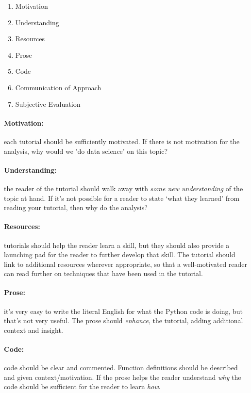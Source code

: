 \documentclass{article}
\begin{document}
\begin{enumerate}
  \item Motivation
  \item Understanding
  \item Resources
  \item Prose
  \item Code
  \item Communication of Approach
  \item Subjective Evaluation
\end{enumerate}

\paragraph{Motivation:} each tutorial should be sufficiently motivated. If
  there is not motivation for the analysis, why would we 'do data science'
  on this topic?

\paragraph{Understanding:} the reader of the tutorial should walk away with
  \emph{some new understanding} of the topic at hand. If it's not possible
  for a reader to state `what they learned' from reading your tutorial, then
  why do the analysis?

\paragraph{Resources:} tutorials should help the reader learn a skill, but
  they should also provide a launching pad for the reader to further develop
  that skill. The tutorial should link to additional resources wherever
  appropriate, so that a well-motivated reader can read further on techniques
  that have been used in the tutorial.

\paragraph{Prose:} it's very easy to write the literal English for what the
  Python code is doing, but that's not very useful. The prose should
  \emph{enhance}, the tutorial, adding additional context and insight.

\paragraph{Code:} code should be clear and commented. Function definitions
  should be described and given context/motivation. If the prose helps
  the reader understand \emph{why} the code should  be sufficient for the
  reader to learn \emph{how}.
\end{document}
